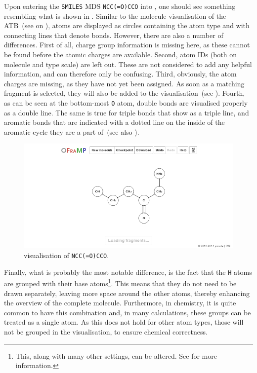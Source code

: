 Upon entering the \verb|SMILES| MDS \verb|NCC(=O)CCO| into \oframp, one should see something resembling what is shown in . Similar to the molecule visualisation of the ATB~(see  on ), atoms are displayed as circles containing the atom type and with connecting lines that denote bonds. However, there are also a number of differences. First of all, charge group information is missing here, as these cannot be found before the atomic charges are available. Second, atom IDs (both on molecule and type scale) are left out. These are not considered to add any helpful information, and can therefore only be confusing. Third, obviously, the atom charges are missing, as they have not yet been assigned. As soon as a matching fragment is selected, they will also be added to the visualisation~(see ). Fourth, as can be seen at the bottom-most \verb|O| atom, double bonds are visualised properly as a double line. The same is true for triple bonds that show as a triple line, and aromatic bonds that are indicated with a dotted line on the inside of the aromatic cycle they are a part of~(see also ).

\begin{figure}
\center
\includegraphics[width=.9\textwidth]{img/impl_visualising.png}
\caption{\oframp{} visualisation of \texttt{NCC(=O)CCO}.}
\end{figure}

Finally, what is probably the most notable difference, is the fact that the \verb|H| atoms are grouped with their base atoms\footnote{This, along with many other settings, can be altered. See  for more information.}. This means that they do not need to be drawn separately, leaving more space around the other atoms, thereby enhancing the overview of the complete molecule. Furthermore, in chemistry, it is quite common to have this combination and, in many calculations, these groups can be treated as a single atom. As this does not hold for other atom types, those will not be grouped in the \oframp{} visualisation, to ensure chemical correctness.

